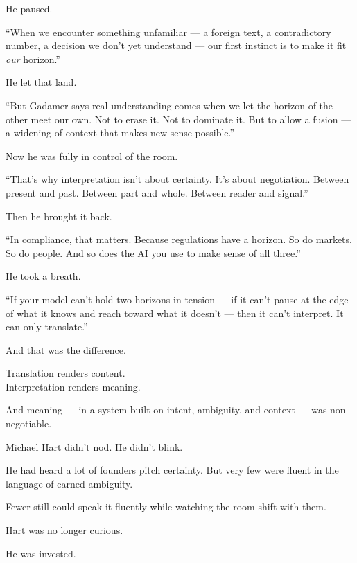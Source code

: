 He paused.

``When we encounter something unfamiliar — a foreign text, a contradictory number, a decision we don’t yet understand — our first instinct is to make it fit \textit{our} horizon.''

He let that land.

``But Gadamer says real understanding comes when we let the horizon of the other meet our own. Not to erase it. Not to dominate it. But to allow a fusion — a widening of context that makes new sense possible.''

Now he was fully in control of the room.

``That’s why interpretation isn’t about certainty. It’s about negotiation.  
Between present and past. Between part and whole. Between reader and signal.''

Then he brought it back.

``In compliance, that matters. Because regulations have a horizon. So do markets. So do people.  
And so does the AI you use to make sense of all three.''

He took a breath.

``If your model can’t hold two horizons in tension —  
if it can’t pause at the edge of what it knows and reach toward what it doesn’t —  
then it can’t interpret.  
It can only translate.''

And that was the difference.

Translation renders content.\\
Interpretation renders meaning.


And meaning — in a system built on intent, ambiguity, and context — was non-negotiable.

Michael Hart didn’t nod. He didn’t blink.

He had heard a lot of founders pitch certainty.  
But very few were fluent in the language of earned ambiguity.

Fewer still could speak it fluently while watching the room shift with them.

Hart was no longer curious.

He was invested.

\medskip


